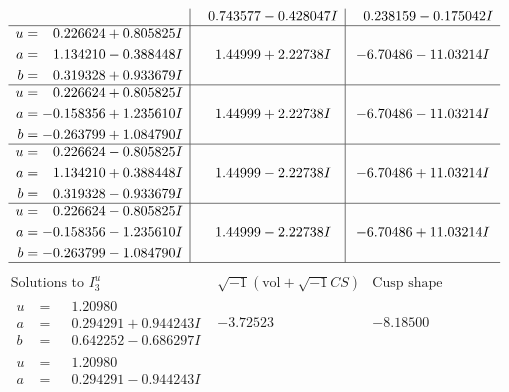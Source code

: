 \documentclass[1p]{elsarticle_modified}
\theoremstyle{definition}
\newcommand{\I}{\sqrt{-1}}
\begin{document}
$$\begin{array}{c|c|c}
 & \phantom{-}0.743577 - 0.428047 I & \phantom{-}0.238159 - 0.175042 I \\ \hline\begin{aligned}
u &= \phantom{-}0.226624 + 0.805825 I \\
a &= \phantom{-}1.134210 - 0.388448 I \\
b &= \phantom{-}0.319328 + 0.933679 I\end{aligned}
 & \phantom{-}1.44999 + 2.22738 I & -6.70486 - 11.03214 I \\ \hline\begin{aligned}
u &= \phantom{-}0.226624 + 0.805825 I \\
a &= -0.158356 + 1.235610 I \\
b &= -0.263799 + 1.084790 I\end{aligned}
 & \phantom{-}1.44999 + 2.22738 I & -6.70486 - 11.03214 I \\ \hline\begin{aligned}
u &= \phantom{-}0.226624 - 0.805825 I \\
a &= \phantom{-}1.134210 + 0.388448 I \\
b &= \phantom{-}0.319328 - 0.933679 I\end{aligned}
 & \phantom{-}1.44999 - 2.22738 I & -6.70486 + 11.03214 I \\ \hline\begin{aligned}
u &= \phantom{-}0.226624 - 0.805825 I \\
a &= -0.158356 - 1.235610 I \\
b &= -0.263799 - 1.084790 I\end{aligned}
 & \phantom{-}1.44999 - 2.22738 I & -6.70486 + 11.03214 I\\
 \hline 
 \end{array}$$\newpage$$\begin{array}{c|c|c}  
\text{Solutions to }I^u_{3}& \I (\text{vol} + \sqrt{-1}CS) & \text{Cusp shape}\\
 \hline 
\begin{aligned}
u &= \phantom{-}1.20980\phantom{ +0.000000I} \\
a &= \phantom{-}0.294291 + 0.944243 I \\
b &= \phantom{-}0.642252 - 0.686297 I\end{aligned}
 & -3.72523\phantom{ +0.000000I} & -8.18500\phantom{ +0.000000I} \\ \hline\begin{aligned}
u &= \phantom{-}1.20980\phantom{ +0.000000I} \\
a &= \phantom{-}0.294291 - 0.944243 I \\

\end{aligned}
\end{array}$$
\end{document}

